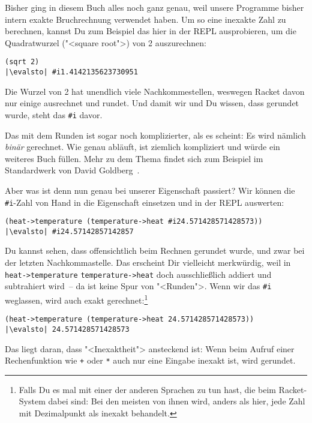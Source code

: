 Bisher ging in diesem Buch alles noch ganz genau, weil unsere
Programme bisher intern exakte Bruchrechnung verwendet haben.  Um so
eine inexakte Zahl zu berechnen, kannst Du zum Beispiel das hier in
der REPL ausprobieren, um die Quadratwurzel ("<square root">) von 2
auszurechnen:
%
\begin{lstlisting}
(sqrt 2)
|\evalsto| #i1.4142135623730951
\end{lstlisting}
%
Die Wurzel von 2 hat unendlich viele Nachkommestellen, weswegen Racket
davon nur einige ausrechnet und rundet.  Und damit wir und Du wissen,
dass gerundet wurde, steht das \lstinline{#i} davor.

Das mit dem Runden ist sogar noch komplizierter, als es scheint: Es
wird nämlich \emph{binär} gerechnet.  Wie genau abläuft, ist ziemlich
kompliziert und würde ein weiteres Buch füllen.  Mehr zu dem Thema
findet sich zum Beispiel im Standardwerk von David
Goldberg~\cite{Goldberg1991}.

Aber was ist denn nun genau bei unserer Eigenschaft passiert?  Wir
können die \lstinline{#i}-Zahl von Hand in die Eigenschaft einsetzen
und in der REPL auswerten:
%
\begin{lstlisting}
(heat->temperature (temperature->heat #i24.571428571428573))
|\evalsto| #i24.57142857142857
\end{lstlisting}
%
Du kannst sehen, dass offensichtlich beim Rechnen gerundet wurde, und
zwar bei der letzten Nachkommastelle.  Das erscheint Dir vielleicht
merkwürdig, weil in \lstinline{heat->temperature}
\lstinline{temperature->heat} doch ausschließlich addiert und
subtrahiert wird~-- da ist keine Spur von "<Runden">.  Wenn wir das
\lstinline{#i} weglassen, wird auch exakt gerechnet:\footnote{Falls Du
  es mal mit einer der anderen Sprachen zu tun hast, die beim
  Racket-System dabei sind: Bei den meisten von ihnen wird, anders als
  hier, jede Zahl mit Dezimalpunkt als inexakt behandelt.}
%
\begin{lstlisting}
(heat->temperature (temperature->heat 24.571428571428573))
|\evalsto| 24.571428571428573
\end{lstlisting}
%
Das liegt daran, dass "<Inexaktheit"> ansteckend ist: Wenn beim Aufruf
einer Rechenfunktion wie \lstinline{+} oder \lstinline{*} auch nur
eine Eingabe inexakt ist, wird gerundet.

